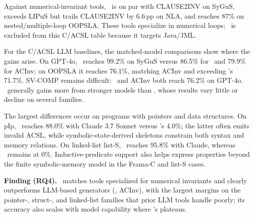 
Against numerical-invariant tools, \toolname\ is on par with CLAUSE2INV on
SyGuS, exceeds LIPuS but trails CLAUSE2INV by 6.6\,pp on NLA, and reaches
87\% on nested/multiple-loop OOPSLA. These tools specialize in numerical
loops; \specgen\ is excluded from this C/ACSL table because it targets
Java/JML.

For the C/ACSL LLM baselines, the matched-model comparisons show where the
gains arise. On GPT-4o, \toolname\ reaches 99.2\% on SyGuS versus 86.5\% for
\autospec\ and 79.9\% for ACInv; on OOPSLA it reaches 76.1\%, matching ACInv
and exceeding \autospec's 71.7\%. SV-COMP remains difficult: \toolname\ and
ACInv both reach 76.2\% on GPT-4o. \toolname\ generally gains more from
stronger models than \autospec, whose results vary little or decline on
several families.

The largest differences occur on programs with pointers and data structures.
On pIp, \toolname\ reaches 88.0\% with Claude 3.7 Sonnet versus \autospec's
4.0\%; the latter often emits invalid ACSL, while symbolic-state-derived
skeletons constrain both syntax and memory relations. On linked-list list-S,
\toolname\ reaches 95.8\% with Claude, whereas \autospec\ remains at 0\%.
Inductive-predicate support also helps express properties beyond the finite
symbolic-memory model in the Frama-C and list-S cases.

\begin{finding}
\textbf{Finding (RQ4).} \toolname\ matches tools specialized for numerical invariants and clearly outperforms LLM-based generators (\autospec, ACInv), with the largest margins on the pointer-, struct-, and linked-list families that prior LLM tools handle poorly; its accuracy also scales with model capability where \autospec's plateaus.
\end{finding}







